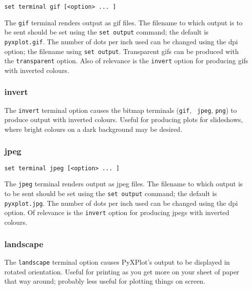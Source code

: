 \documentclass[a4paper,onecolumn,11pt]{book}
\begin{document}
\begin{verbatim}
set terminal gif [<option> ... ]
\end{verbatim}

The {\tt gif} terminal renders output as gif files. The filename to which output
is to be sent should be set using the {\tt set output} command; the default is
{\tt pyxplot.gif}. The number of dots per inch used can be changed using the dpi
option; the filename using {\tt set output}. Transparent gifs can be produced
with the {\tt transparent} option. Also of relevance is the {\tt invert} option
for producing gifs with inverted colours.


\subsubsection{invert}

The {\tt invert} terminal option causes the bitmap terminals ({\tt gif}, {\tt
jpeg}, {\tt png}) to produce output with inverted colours. Useful for producing
plots for slideshows, where bright colours on a dark background may be desired.


\subsubsection{jpeg}

\begin{verbatim}
set terminal jpeg [<option> ... ]
\end{verbatim}

The {\tt jpeg} terminal renders output as jpeg files. The filename to which
output is to be sent should be set using the {\tt set output} command; the
default is {\tt pyxplot.jpg}.  The number of dots per inch used can be changed
using the dpi option. Of relevance is the {\tt invert} option for producing
jpegs with inverted colours.

\subsubsection{landscape}

The {\tt landscape} terminal option causes PyXPlot's output to be displayed in
rotated orientation.  Useful for printing as you get more on your sheet of
paper that way around; probably less useful for plotting things on screen.
\end{document}
